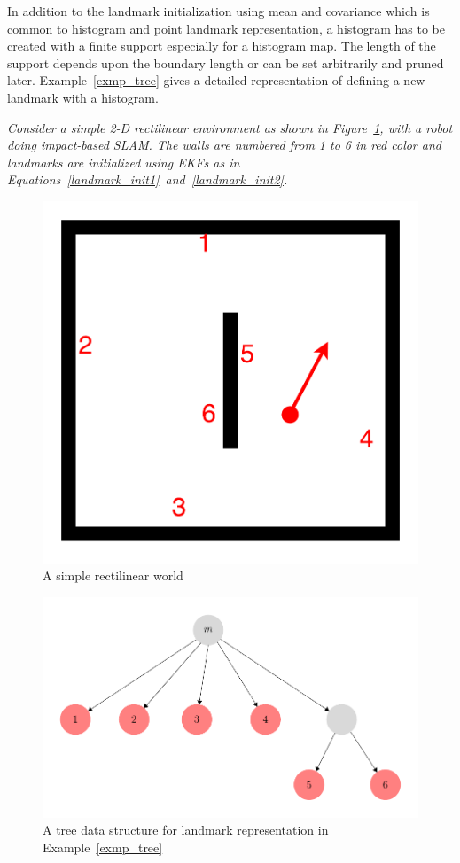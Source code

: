 In addition to the landmark initialization using mean and covariance which is common to histogram and point landmark representation, a histogram has to be created with a finite support especially for a histogram map. The length of the support depends upon the boundary length or can be set arbitrarily and pruned later. Example~\ref{exmp_tree} gives a detailed representation of defining a new landmark with a histogram. 

\begin{exmp}{\it Consider a simple 2-D rectilinear environment as shown in Figure~\ref{rect_world}, with a robot doing impact-based SLAM. The walls are numbered from 1 to 6 in red color and landmarks are initialized using EKFs as in Equations~\ref{landmark_init1}~and~\ref{landmark_init2}.}
\begin{figure}
\centering
\includegraphics[scale=0.4]{./images/add_landmark}
\caption[A sample rectilinear world]{A simple rectilinear world}
\label{rect_world}
\end{figure}
\begin{figure}
\centering
\includegraphics[scale=1]{./images/fsm7}
\caption[A tree data structure for landmark representation]{A tree data structure for landmark representation in Example~\ref{exmp_tree}}
\label{tree_landmark}
\end{figure}
\label{exmp_tree}
\end{exmp}
